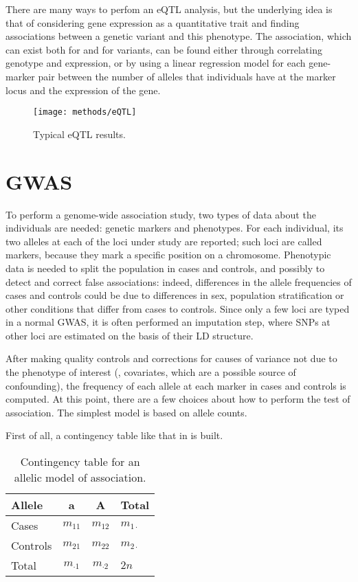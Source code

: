\documentclass[../main.tex]{subfiles}
\begin{document}
There are many ways to perfom an eQTL analysis\autocite{Gilad2008}, but the 
underlying idea is that of considering gene expression as a quantitative 
trait and finding associations between a genetic variant and this 
phenotype. The association, which can exist both for \cis and for \trans 
variants, can be found either through correlating genotype and 
expression, or by using a linear regression model for each gene-marker 
pair between the number of alleles that individuals have at the marker 
locus and the expression of the gene.

\begin{figure}
	\centering
	\texttt{[image: methods/eQTL]}
	\caption{Typical eQTL results.}
\end{figure}

\section{GWAS}

To perform a genome-wide association study\autocite{Clarke2011}, two 
types of data about the individuals are needed: genetic markers and 
phenotypes. For each individual, its two alleles at each of the loci 
under study are reported; such loci are called markers, because they 
mark a specific position on a chromosome. Phenotypic data is needed to 
split the population in cases and controls, and possibly to detect and 
correct false associations: indeed, differences in the allele 
frequencies of cases and controls could be due to differences in sex, 
population stratification or other conditions that differ from cases to 
controls\autocite{Price2006}. Since only a few loci are typed in a 
normal GWAS, it is often performed an imputation step, where SNPs at 
other loci are estimated on the basis of their LD structure.

After making quality controls and corrections for causes of variance not 
due to the phenotype of interest (\ie, covariates, which are a possible 
source of confounding), the frequency of each allele at each marker in 
cases and controls is computed. At this point, there are a few choices 
about how to perform the test of association. The simplest model is 
based on allele counts.

First of all, a contingency table like that in  
is built.

\begin{table}
	\centering
	\begin{tabular}{ l c c l}
		\toprule
		Allele & a & A & Total \\
		\midrule
		Cases & $m_{11}$ & $m_{12}$ & $m_{1\cdot}$ \\
		Controls & $m_{21}$ & $m_{22}$ & $m_{2\cdot}$ \\
		Total & $m_{\cdot1}$ & $m_{\cdot2}$ & $2n$ \\
		\bottomrule
	\end{tabular}
	\caption{Contingency table for an allelic model of association.}
\end{table}
\end{document}
